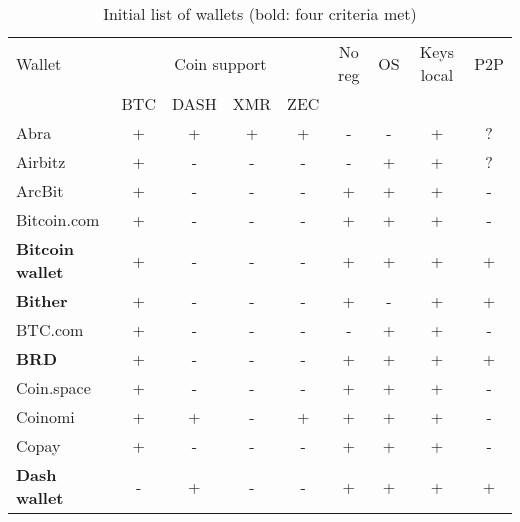 



\begin{table*}
\normalsize
\caption{Initial list of wallets (bold: four criteria met)}
\centering
\begin{tabular}{ | l | c c c c | c | c | c | c | }
	\hline
	Wallet & \multicolumn{4}{|c|}{Coin support} & No reg & OS & Keys local & P2P \\ 
	& BTC & DASH & XMR & ZEC &  &  &  &  \\ 
	\hline
	Abra & + & + & + & + & - & - & + & ? \\
	\hline
	Airbitz & + & - & - & - & - & + & + & ? \\
	\hline
	ArcBit & + & - & - & - & + & + & + & - \\
	\hline
	Bitcoin.com & + & - & - & - & + & + & + & - \\
	\hline
	\textbf{Bitcoin wallet} & + & - & - & - & + & + & + & + \\
	\hline
	\textbf{Bither} & + & - & - & - & + & - & + & + \\
	\hline
	BTC.com & + & - & - & - & - & + & + & - \\
	\hline
	\textbf{BRD} & + & - & - & - & + & + & + & + \\
	\hline
	Coin.space & + & - & - & - & + & + & + & - \\
	\hline
	Coinomi & + & + & - & + & + & + & + & - \\
	\hline
	Copay & + & - & - & - & + & + & + & - \\
	\hline
	\textbf{Dash wallet} & - & + & - & - & + & + & + & + \\

\end{tabular}
\end{table*}
